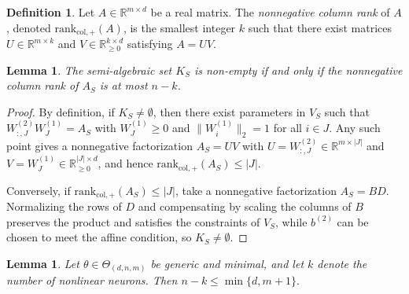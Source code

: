 \documentclass{article}
\newtheorem{lemma}[theorem]{Lemma}
\theoremstyle{definition}
\newtheorem{definition}[theorem]{Definition}
\newcommand{\R}{\mathbb{R}}
\newcommand{\paramspace}[1]{\Theta_{#1}}
\newcommand{\weights}[1]{W^{(#1)}}
\newcommand{\bias}[1]{b^{(#1)}}
\newcommand{\nncr}[1]{\mathrm{rank}_{\mathrm{col},+}(#1)}
\begin{document}
\begin{definition}
Let $A \in \R^{m \times d}$ be a real matrix. The \emph{nonnegative column rank} of $A$, denoted $\nncr{A}$, is the smallest integer $k$ such that there exist matrices $U \in \R^{m \times k}$ and $V \in \R_{\ge 0}^{k \times d}$ satisfying $A = UV$.
\end{definition}


\begin{lemma}
\label{lem:nncratmostL}
The semi-algebraic set $K_S$ is non-empty if and only if the nonnegative column rank of $A_S$ is at most $n-k$. 
\end{lemma}

\begin{proof}
By definition, if $K_S\neq\emptyset$, then there exist parameters in $V_S$ such that
\(
\weights{2}_{:,J}\weights{1}_J=A_S
\)
with $\weights{1}_J\ge0$ and $\|\weights{1}_i\|_2=1$ for all $i\in J$. Any such point gives a nonnegative factorization $A_S=UV$ with $U=\weights{2}_{:,J}\in\R^{m\times|J|}$ and $V=\weights{1}_J\in\R_{\ge0}^{|J|\times d}$, and hence $\nncr{A_S}\le|J|$. 

Conversely, if $\nncr{A_S}\le|J|$, take a nonnegative factorization $A_S=BD$. 
Normalizing the rows of $D$ and compensating by scaling the columns of $B$ preserves the product and satisfies the constraints of $V_S$, 
while $\bias{2}$ can be chosen to meet the affine condition, so $K_S\neq\emptyset$. 
\end{proof}

\begin{lemma}
\label{lem:minimality_bounds_linear_neurons}
Let $\theta \in \paramspace{(d,n,m)}$ be generic and minimal, and let $k$ denote the number
of nonlinear neurons. Then
$
n-k \le \min\{d,m+1\}.
$
\end{lemma}
\end{document}
